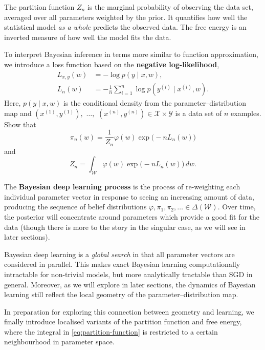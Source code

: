 \documentclass[11pt]{article}
\newcommand{\X}{\mathcal{X}}
\newcommand{\Y}{\mathcal{Y}}
\newcommand{\W}{\mathcal{W}}
\begin{document}
The partition function $Z_n$ is the marginal probability of observing the data
set, averaged over all parameters weighted by the prior. It quantifies how well
the statistical model \emph{as a whole} predicts the observed data. The free
energy is an inverted measure of how well the model fits the data.

\begin{exercise}
\label{ex:gibbs}
    To interpret Bayesian inference in terms more similar to function
    approximation, we introduce a loss function based on the
    \textbf{negative log-likelihood},
    \begin{align}
    \label{eq:nll-loss}
        L_{x,y}(w)
        &= -\log p(y \mid x, w),
    \\  L_n(w)
        &= -\frac{1}{n} \sum_{i=1}^{n} \log p(y^{(i)} \mid x^{(i)}, w).
    \end{align}
    Here, $p(y \mid x, w)$ is the conditional density from the
    parameter--distribution map and 
        $(x^{(1)}, y^{(1)}),$ $\ldots,$ $(x^{(n)}, y^{(n)}) \in \X \times \Y$
    is a data set of $n$ examples.
    Show that
    $$
        \pi_n(w)
        = \frac{1}{Z_n} \varphi(w) \exp\!\big({-}n L_n(w)\big)
    $$
    and
    $$
        Z_n
        = \int_{\W} \varphi(w) \exp\!\big({-}n L_n(w)\big)\, dw.
    $$
\end{exercise}

The \textbf{Bayesian deep learning process} is the process of re-weighting each
individual parameter vector in response to seeing an increasing amount of data,
producing the sequence of belief distributions
    $\varphi, \pi_1, \pi_2, \ldots \in \Delta(\W)$.
Over time, the posterior will concentrate around parameters which provide a good
fit for the data (though there is more to the story in the singular case, as we
will see in later sections).

Bayesian deep learning is a \emph{global search} in that all parameter vectors are
considered in parallel. This makes exact Bayesian learning computationally
intractable for non-trivial models, but more analytically tractable than SGD in
general. Moreover, as we will explore in later sections, the dynamics of Bayesian
learning still reflect the local geometry of the parameter--distribution map.

In preparation for exploring this connection between geometry and learning, we
finally introduce localised variants of the partition function and free energy,
where the integral in \eqref{eq:partition-function} is restricted to a certain
neighbourhood in parameter space.
\end{document}
